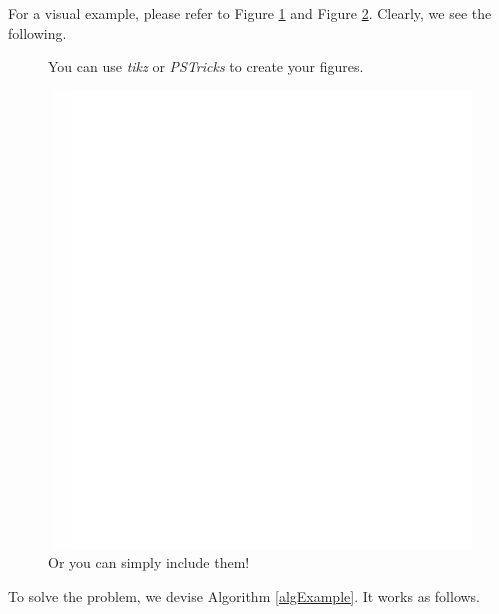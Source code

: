 \documentclass[12pt]{article}
\begin{document}
For a visual example, please refer to Figure \ref{figExample1} and Figure \ref{figExample2}. Clearly, we see the following. \lipsum[1]

\begin{figure}[htbp]
\centering
\caption{You can use {\em tikz} or {\em PSTricks} to create your figures. \label{figExample1}}
\end{figure}

\begin{figure}[htbp]
\centering
\caption{Or you can simply include them! \label{figExample2}}
 \includegraphics[scale=0.65]{example.pdf}
\end{figure}



To solve the problem, we devise Algorithm \ref{algExample}. It works as follows. \lipsum[2-4]
\end{document}
